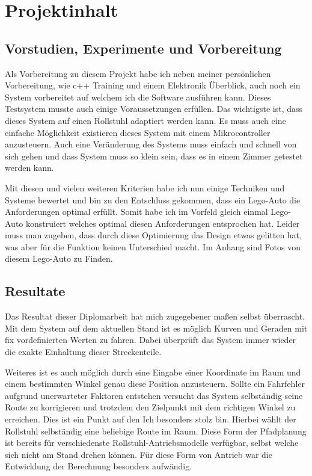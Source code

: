 \section{Projektinhalt}


\subsection{Vorstudien, Experimente und Vorbereitung}
Als Vorbereitung zu diesem Projekt habe ich neben meiner persönlichen Vorbereitung, wie c++ Training und einem Elektronik Überblick, auch noch ein System vorbereitet auf welchem ich die Software ausführen kann.
Dieses Testsystem musste auch einige Voraussetzungen erfüllen.
Das wichtigste ist, dass dieses System auf einen Rollstuhl adaptiert werden kann.
Es muss auch eine einfache Möglichkeit existieren dieses System mit einem Mikrocontroller anzusteuern.
Auch eine Veränderung des Systems muss einfach und schnell von sich gehen und dass System muss so klein sein, dass es in einem Zimmer getestet werden kann.

Mit diesen und vielen weiteren Kriterien habe ich nun einige Techniken und Systeme bewertet und bin zu den Entschluss gekommen, dass ein Lego-Auto die Anforderungen optimal erfüllt.
Somit habe ich im Vorfeld gleich einmal Lego-Auto konstruiert welches optimal diesen Anforderungen entsprochen hat.
Leider muss man zugeben, dass durch diese Optimierung das Design etwas gelitten hat, was aber für die Funktion keinen Unterschied macht.
Im Anhang sind Fotos von diesem Lego-Auto zu Finden.


\subsection{Resultate}
Das Resultat dieser Diplomarbeit hat mich zugegebener maßen selbst überrascht.
Mit dem System auf dem aktuellen Stand ist es möglich Kurven und Geraden mit fix vordefinierten Werten zu fahren.
Dabei überprüft das System immer wieder die exakte Einhaltung dieser Streckenteile.

Weiteres ist es auch möglich durch eine Eingabe einer Koordinate im Raum und einem bestimmten Winkel genau diese Position anzusteuern.
Sollte ein Fahrfehler aufgrund unerwarteter Faktoren entstehen versucht das System selbständig seine Route zu korrigieren und trotzdem den Zielpunkt mit dem richtigen Winkel zu erreichen.
Dies ist ein Punkt auf den Ich besonders stolz bin.
Hierbei wählt der Rollstuhl selbständig eine beliebige Route im Raum.
Diese Form der Pfadplanung ist bereits für verschiedenste Rollstuhl-Antriebsmodelle verfügbar, selbst welche sich nicht am Stand drehen können.
Für diese Form von Antrieb war die Entwicklung der Berechnung besonders aufwändig.

